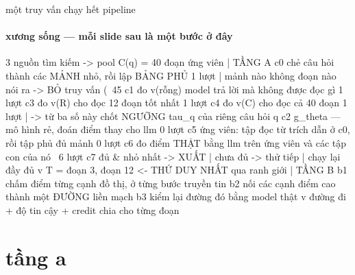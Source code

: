 \documentclass[aspectratio=169,10pt]{beamer}
\begin{document}
\begin{frame}[fragile]{một truy vấn chạy hết pipeline}
  \framesubtitle{xương sống — mỗi slide sau là một bước ở đây}
\begin{dia}
        3 nguồn tìm kiếm  ->  pool C(q) = 40 đoạn ứng viên
           |
TẦNG A  c0   chẻ câu hỏi thành các MẢNH nhỏ, rồi lập BẢNG PHỦ          1 lượt
           |      mảnh nào không đoạn nào nói ra  ->  BỎ truy vấn       (~45%
        c1   đo v(rỗng)   model trả lời mà không được đọc gì            1 lượt
        c3   đo v(R)      cho đọc 12 đoạn tốt nhất                      1 lượt
        c4   đo v(C)      cho đọc cả 40 đoạn                            1 lượt
           |      ->  từ ba số này chốt NGƯỠNG tau_q của riêng câu hỏi q
        c2   g_theta — mô hình rẻ, đoán điểm thay cho llm               0 lượt
        c5   ứng viên: tập đọc từ trích dẫn ở c0, rồi tập phủ đủ mảnh   0 lượt
        c6   đo điểm THẬT bằng llm trên ứng viên và các tập con của nó ~6 lượt
        c7   đủ & nhỏ nhất -> XUẤT  |  chưa đủ -> thử tiếp  |  chạy lại đầy đủ
           v
        T = {đoạn 3, đoạn 12}              <-  THỨ DUY NHẤT qua ranh giới
           |
TẦNG B  b1   chấm điểm từng cạnh đồ thị, ở từng bước truyền tin
        b2   nối các cạnh điểm cao thành một ĐƯỜNG liền mạch
        b3   kiểm lại đường đó bằng model thật
           v
        đường đi  +  độ tin cậy  +  credit chia cho từng đoạn
\end{dia}
\end{frame}
\section{tầng a}
\end{document}
